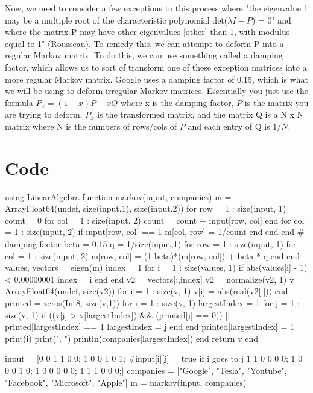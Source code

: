 \documentclass{article}
\begin{document}
Now, we need to consider a few exceptions to this process where "the eigenvalue 1 may be a multiple root of the characteristic polynomial det($\lambda I - P$) = 0" and where the matrix P may have other eigenvalues [other] than 1, with modulus equal to 1" (Rousseau). To remedy this, we can attempt to deform P into a regular Markov matrix. To do this, we can use something called a damping factor, which allows us to sort of transform one of these exception matrices into a more regular Markov matrix. Google uses a damping factor of 0.15, which is what we will be using to deform irregular Markov matrices. Essentially you just use the formula $P_x = (1-x)P + xQ$ where x is the damping factor, $P$ is the matrix you are trying to deform, $P_x$ is the transformed matrix, and the matrix Q is a N x N matrix where N is the numbers of rows/cols of $P$ and each entry of Q is $1/N$.



\section{Code}
\begin{codeblock}
using LinearAlgebra
function markov(input, companies)
    m = Array{Float64}(undef, size(input,1), size(input,2))
    for row = 1 : size(input, 1)
        count = 0
        for col = 1 : size(input, 2)
            count = count + input[row, col]
        end
        for col = 1 : size(input, 2)
            if input[row, col] == 1
                m[col, row] = 1/count
            end
        end
    end
    # damping factor
    beta = 0.15
    q = 1/size(input,1)
    for row = 1 : size(input, 1)
        for col = 1 : size(input, 2)
            m[row, col] = (1-beta)*(m[row, col]) + beta * q
        end
    end
    values, vectors = eigen(m)
    index = 1
    for i = 1 : size(values, 1)
        if abs(values[i] - 1) < 0.00000001
            index = i
        end
    end
    v2 = vectors[:,index]
    v2 = normalize(v2, 1)
    v = Array{Float64}(undef, size(v2))
    for i = 1 : size(v, 1)
        v[i] = abs(real(v2[i]))
    end
    printed = zeros(Int8, size(v,1))
    for i = 1 : size(v, 1)
        largestIndex = 1
        for j = 1 : size(v, 1)
            if ((v[j] > v[largestIndex]) && (printed[j] == 0)) || printed[largestIndex] == 1
                largestIndex = j
            end
        end
        printed[largestIndex] = 1
        print(i)
        print(". ")
        println(companies[largestIndex])
    end
    return v
end
\end{codeblock}
\begin{codeblock}
input = [0 0 1 1 0 0;
         1 0 0 1 0 1; #input[i][j] = true if i goes to j
         1 1 0 0 0 0;
         1 0 0 0 1 0;
         1 0 0 0 0 0;
         1 1 1 0 0 0;]
companies = ["Google", "Tesla", "Youtube", "Facebook", "Microsoft", "Apple"]
m = markov(input, companies)
\end{codeblock}
\end{document}
